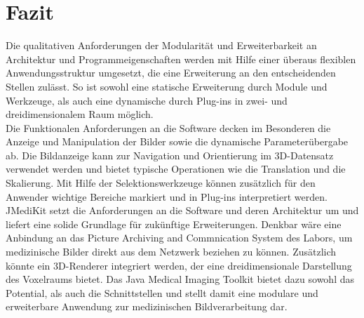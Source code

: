 \chapter{Fazit}

Die qualitativen Anforderungen der Modularität und Erweiterbarkeit an Architektur und Programmeigenschaften werden mit Hilfe einer überaus flexiblen Anwendungsstruktur umgesetzt, die eine Erweiterung an den entscheidenden Stellen zulässt. So ist sowohl eine statische Erweiterung durch Module und Werkzeuge, als auch eine dynamische durch Plug-ins in zwei- und dreidimensionalem Raum möglich.\\
Die Funktionalen Anforderungen an die Software decken im Besonderen die Anzeige und Manipulation der Bilder sowie die dynamische Parameterübergabe ab. Die Bildanzeige kann zur Navigation und Orientierung im 3D-Datensatz verwendet werden und bietet typische Operationen wie die Translation und die Skalierung. Mit Hilfe der Selektionswerkzeuge können zusätzlich für den Anwender wichtige Bereiche markiert und in Plug-ins interpretiert werden.\\
JMediKit setzt die Anforderungen an die Software und deren Architektur um und liefert eine solide Grundlage für zukünftige Erweiterungen. Denkbar wäre eine Anbindung an das Picture Archiving and Commnication System des Labors, um medizinische Bilder direkt aus dem Netzwerk beziehen zu können. Zusätzlich könnte ein 3D-Renderer integriert werden, der eine dreidimensionale Darstellung des Voxelraums bietet.
Das Java Medical Imaging Toolkit bietet dazu sowohl das Potential, als auch die Schnittstellen und stellt damit eine modulare und erweiterbare Anwendung zur medizinischen Bildverarbeitung dar.

